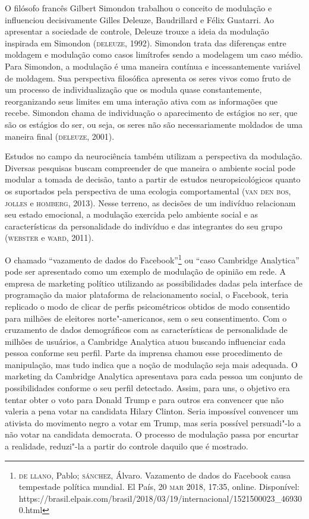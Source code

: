 O filósofo francês Gilbert Simondon trabalhou o conceito de modulação e
influenciou decisivamente Gilles Deleuze, Baudrillard e Félix Guatarri.
Ao apresentar a sociedade de controle, Deleuze trouxe a ideia da
modulação inspirada em Simondon (\textsc{deleuze}, 1992). Simondon trata das
diferenças entre moldagem e modulação como casos limítrofes sendo a
modelagem um caso médio. Para Simondon, a modulação é uma maneira
contínua e incessantemente variável de moldagem. Sua perspectiva
filosófica apresenta os seres vivos como fruto de um processo de
individualização que os modula quase constantemente, reorganizando seus
limites em uma interação ativa com as informações que recebe. Simondon
chama de individuação o aparecimento de estágios no ser, que são os
estágios do ser, ou seja, os seres não são necessariamente moldados de
uma maneira final (\textsc{deleuze}, 2001).

Estudos no campo da neurociência também utilizam a perspectiva da
modulação. Diversas pesquisas buscam compreender de que maneira o
ambiente social pode modular a tomada de decisão, tanto a partir de
estudos neuropsicológicos quanto os suportados pela perspectiva de uma
ecologia comportamental (\textsc{van den bos}, \textsc{jolles} e \textsc{homberg}, 2013). Nesse
terreno, as decisões de um indivíduo relacionam seu estado emocional, a
modulação exercida pelo ambiente social e as características da
personalidade do indivíduo e das integrantes do seu grupo (\textsc{webster} e
\textsc{ward}, 2011).

O chamado ``vazamento de dados do Facebook''\footnote{\textsc{de llano}, Pablo;
  \textsc{sánchez}, Álvaro. Vazamento de dados do Facebook causa tempestade
  política mundial. El País, 20 \textsc{mar} 2018, 17:35, online. Disponível:
  https://brasil.elpais.com/brasil/2018/03/19/internacional/1521500023\_469300.html}
ou ``caso Cambridge Analytica'' pode ser apresentado como um exemplo de
modulação de opinião em rede. A empresa de marketing político utilizando
as possibilidades dadas pela interface de programação da maior
plataforma de relacionamento social, o Facebook, teria replicado o modo
de clicar de perfis psicométricos obtidos de modo consentido para
milhões de eleitores norte"-americanos, sem o seu consentimento. Com o
cruzamento de dados demográficos com as características de personalidade
de milhões de usuários, a Cambridge Analytica atuou buscando influenciar
cada pessoa conforme seu perfil. Parte da imprensa chamou esse
procedimento de manipulação, mas tudo indica que a noção de modulação
seja mais adequada. O marketing da Cambridge Analytica apresentava para
cada pessoa um conjunto de possibilidades conforme o seu perfil
detectado. Assim, para uns, o objetivo era tentar obter o voto para
Donald Trump e para outros era convencer que não valeria a pena votar na
candidata Hilary Clinton. Seria impossível convencer um ativista do
movimento negro a votar em Trump, mas seria possível persuadi"-lo a não
votar na candidata democrata. O processo de modulação passa por encurtar
a realidade, reduzi"-la a partir do controle daquilo que é mostrado.

